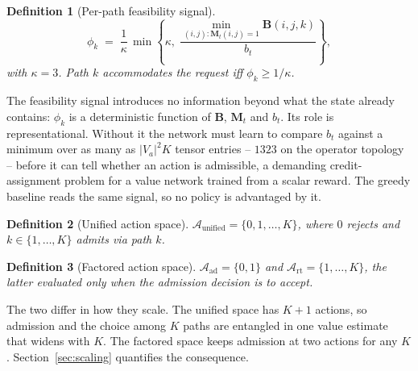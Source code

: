 \documentclass[10pt,journal,comsoc]{IEEEtran}
\newtheorem{definition}{Definition}
\begin{document}
\begin{definition}[Per-path feasibility signal]
\label{def:phi}
\begin{equation}
\phi_k \;=\; \frac{1}{\kappa}\,
\min\!\left\{\kappa,\;
\frac{\min_{(i,j):\mathbf{M}_t(i,j)=1} \mathbf{B}(i,j,k)}{b_t}\right\},
\label{eq:phi}
\end{equation}
with $\kappa=3$. Path $k$ accommodates the request iff $\phi_k \geq 1/\kappa$.
\end{definition}

The feasibility signal introduces no information beyond what the state
already contains: $\phi_k$ is a deterministic function of $\mathbf{B}$,
$\mathbf{M}_t$ and $b_t$. Its role is representational. Without it the
network must learn to compare $b_t$ against a minimum over as many as
$|V_a|^2K$ tensor entries -- $1323$ on the operator topology -- before it
can tell whether an action is admissible, a demanding credit-assignment
problem for a value network trained from a scalar reward. The greedy
baseline reads the same signal, so no policy is advantaged by it.

\begin{definition}[Unified action space]
\label{def:unified}
$\mathcal{A}_{\text{unified}}=\{0,1,\dots,K\}$, where $0$ rejects and
$k\in\{1,\dots,K\}$ admits via path $k$.
\end{definition}

\begin{definition}[Factored action space]
\label{def:separated}
$\mathcal{A}_{\text{ad}}=\{0,1\}$ and $\mathcal{A}_{\text{rt}}=\{1,\dots,K\}$,
the latter evaluated only when the admission decision is to accept.
\end{definition}

The two differ in how they scale. The unified space has $K+1$ actions, so
admission and the choice among $K$ paths are entangled in one value
estimate that widens with $K$. The factored space keeps admission at two
actions for any $K$. Section~\ref{sec:scaling} quantifies the consequence.
\end{document}
